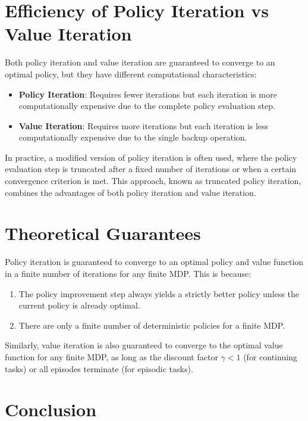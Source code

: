 \documentclass{article}
\begin{document}
\section{Efficiency of Policy Iteration vs Value Iteration}

Both policy iteration and value iteration are guaranteed to converge to an optimal policy, but they have different computational characteristics:

\begin{itemize}
    \item \textbf{Policy Iteration}: Requires fewer iterations but each iteration is more computationally expensive due to the complete policy evaluation step.
    \item \textbf{Value Iteration}: Requires more iterations but each iteration is less computationally expensive due to the single backup operation.
\end{itemize}

In practice, a modified version of policy iteration is often used, where the policy evaluation step is truncated after a fixed number of iterations or when a certain convergence criterion is met. This approach, known as truncated policy iteration, combines the advantages of both policy iteration and value iteration.

\section{Theoretical Guarantees}

Policy iteration is guaranteed to converge to an optimal policy and value function in a finite number of iterations for any finite MDP. This is because:

\begin{enumerate}
    \item The policy improvement step always yields a strictly better policy unless the current policy is already optimal.
    \item There are only a finite number of deterministic policies for a finite MDP.
\end{enumerate}

Similarly, value iteration is also guaranteed to converge to the optimal value function for any finite MDP, as long as the discount factor $\gamma < 1$ (for continuing tasks) or all episodes terminate (for episodic tasks).

\section{Conclusion}
\end{document}
